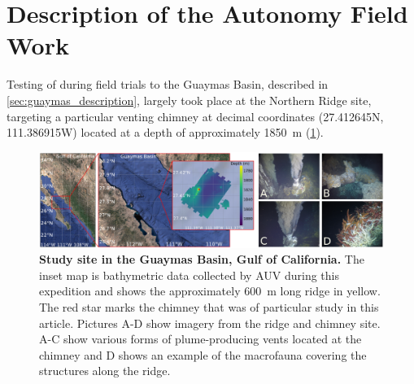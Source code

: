 \section{Description of the Autonomy Field Work}
Testing of \PHORTEX during field trials to the Guaymas Basin, described in \cref{sec:guaymas_description}, largely took place at the Northern Ridge site, targeting a particular venting chimney at decimal coordinates (27.412645N, 111.386915W) located at a depth of approximately \SI{1850}{\meter} (\cref{fig:autonomy_site}). 

\begin{figure}[h!]
    \centering
    \includegraphics[width=\columnwidth]{figures/site_summary.png}
    \caption{\textbf{Study site in the Guaymas Basin, Gulf of California.} The inset map is bathymetric data collected by AUV \Sentry during this expedition and shows the approximately \SI{600}{\meter} long ridge in yellow. The red star marks the chimney that was of particular study in this article. Pictures A-D show imagery from the ridge and chimney site. A-C show various forms of plume-producing vents located at the chimney and D shows an example of the macrofauna covering the structures along the ridge.}
    \label{fig:autonomy_site}
\end{figure}


